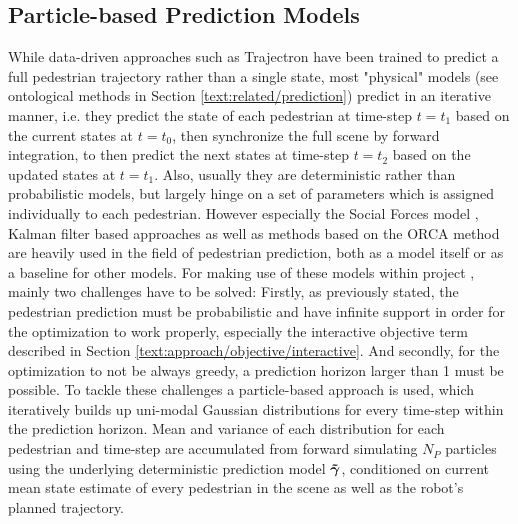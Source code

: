 \subsection{Particle-based Prediction Models} 
\label{text:exp_particles}
While data-driven approaches such as Trajectron \cite{Ivanovic2018} have been trained to predict a full pedestrian trajectory rather than a single state, most "physical" models (see ontological methods in Section \ref{text:related/prediction}) predict in an iterative manner, i.e. they predict the state of each pedestrian at time-step $t = t_1$ based on the current states at $t = t_0$, then synchronize the full scene by forward integration, to then predict the next states at time-step $t = t_2$ based on the updated states at $t = t_1$. Also, usually they are deterministic rather than probabilistic models, but largely hinge on a set of parameters which is assigned individually to each pedestrian. However especially the Social Forces model \cite{Helbing1995}, Kalman filter based approaches \cite{Schneider2013}\cite{Rehder2015}\cite{Guo2016} as well as methods based on the \ac{ORCA} method \cite{vandenBerg2011}\cite{Luo2018a}\cite{Charlton2019} are heavily used in the field of pedestrian prediction, both as a model itself or as a baseline for other models. 
\newline
For making use of these models within project \project, mainly two challenges have to be solved: Firstly, as previously stated, the pedestrian prediction must be probabilistic and have infinite support in order for the optimization to work properly, especially the interactive objective term described in Section \ref{text:approach/objective/interactive}. And secondly, for the optimization to not be always greedy, a prediction horizon larger than 1 must be possible. 
\newline
To tackle these challenges a particle-based approach is used, which iteratively builds up uni-modal Gaussian distributions for every time-step within the prediction horizon. Mean and variance of each distribution for each pedestrian and time-step are accumulated from forward simulating $N_P$ particles using the underlying deterministic prediction model $\distmodeldet[]$, conditioned on current mean state estimate of every pedestrian in the scene as well as the robot's planned trajectory. 


